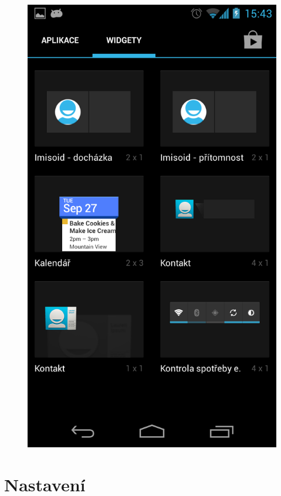 \documentclass{diplomka}
\begin{document}
\begin{figure}[H]
\begin{minipage}{.45\textwidth}
  \includegraphics[width=.9\linewidth]{scr/widgetadd.png}
  \label{fig:widgetadd}
\end{minipage}
\end{figure}


\section{Nastavení}
\label{sec:settings}
\end{document}

